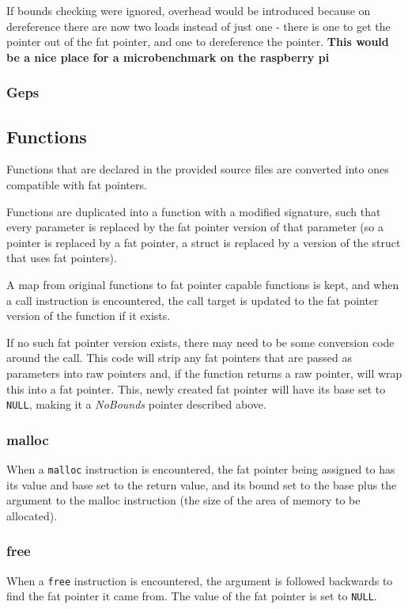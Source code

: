 If bounds checking were ignored, overhead would be introduced because on dereference there are now two loads instead of just one - there is one to get the pointer out of the fat pointer, and one to dereference the pointer.
\textbf{This would be a nice place for a microbenchmark on the raspberry pi}

\subsubsection{Geps}

\subsection{Functions}

Functions that are declared in the provided source files are converted into ones compatible with fat pointers.

Functions are duplicated into a function with a modified signature, such that every parameter is replaced by the fat pointer version of that parameter (so a pointer is replaced by a fat pointer, a struct is replaced by a version of the struct that uses fat pointers).

A map from original functions to fat pointer capable functions is kept, and when a call instruction is encountered, the call target is updated to the fat pointer version of the function if it exists.

If no such fat pointer version exists, there may need to be some conversion code around the call.
This code will strip any fat pointers that are passed as parameters into raw pointers and, if the function returns a raw pointer, will wrap this into a fat pointer.
This, newly created fat pointer will have its base set to \verb!NULL!, making it a \textit{NoBounds} pointer described above.

\subsubsection{malloc}

When a \verb!malloc! instruction is encountered, the fat pointer being assigned to has its value and base set to the return value, and its bound set to the base plus the argument to the malloc instruction (the size of the area of memory to be allocated).

\subsubsection{free}
When a \verb!free! instruction is encountered, the argument is followed backwards to find the fat pointer it came from.
The value of the fat pointer is set to \verb!NULL!.
